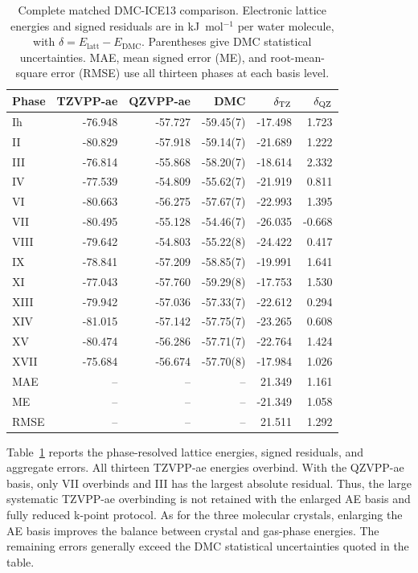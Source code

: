 \documentclass[10pt,a4paper]{article}
\begin{document}
\begin{table}[htbp]
\centering\small
\caption{Complete matched DMC-ICE13 comparison. Electronic lattice energies and signed residuals are in kJ~mol$^{-1}$ per water molecule, with $\delta=E_{\mathrm{latt}}-E_{\mathrm{DMC}}$. Parentheses give DMC statistical uncertainties. MAE, mean signed error (ME), and root-mean-square error (RMSE) use all thirteen phases at each basis level.}
\label{tab:ice-basis}
\begin{tabular}{lrrrrr}
\toprule
Phase & TZVPP-ae & QZVPP-ae & DMC & $\delta_{\rm TZ}$ & $\delta_{\rm QZ}$\\
\midrule
Ih & -76.948 & -57.727 & -59.45(7) & -17.498 & 1.723\\
II & -80.829 & -57.918 & -59.14(7) & -21.689 & 1.222\\
III & -76.814 & -55.868 & -58.20(7) & -18.614 & 2.332\\
IV & -77.539 & -54.809 & -55.62(7) & -21.919 & 0.811\\
VI & -80.663 & -56.275 & -57.67(7) & -22.993 & 1.395\\
VII & -80.495 & -55.128 & -54.46(7) & -26.035 & -0.668\\
VIII & -79.642 & -54.803 & -55.22(8) & -24.422 & 0.417\\
IX & -78.841 & -57.209 & -58.85(7) & -19.991 & 1.641\\
XI & -77.043 & -57.760 & -59.29(8) & -17.753 & 1.530\\
XIII & -79.942 & -57.036 & -57.33(7) & -22.612 & 0.294\\
XIV & -81.015 & -57.142 & -57.75(7) & -23.265 & 0.608\\
XV & -80.474 & -56.286 & -57.71(7) & -22.764 & 1.424\\
XVII & -75.684 & -56.674 & -57.70(8) & -17.984 & 1.026\\
\midrule
MAE & -- & -- & -- & 21.349 & 1.161\\
ME & -- & -- & -- & -21.349 & 1.058\\
RMSE & -- & -- & -- & 21.511 & 1.292\\
\bottomrule
\end{tabular}
\end{table}


Table~\ref{tab:ice-basis} reports the phase-resolved lattice energies, signed residuals, and aggregate errors. All thirteen TZVPP-ae energies overbind. With the QZVPP-ae basis, only VII overbinds and III has the largest absolute residual. Thus, the large systematic TZVPP-ae overbinding is not retained with the enlarged AE basis and fully reduced k-point protocol.  As for the three molecular crystals, enlarging the AE basis improves the balance between crystal and gas-phase energies. The remaining errors generally exceed the DMC statistical uncertainties quoted in the table.
\end{document}
